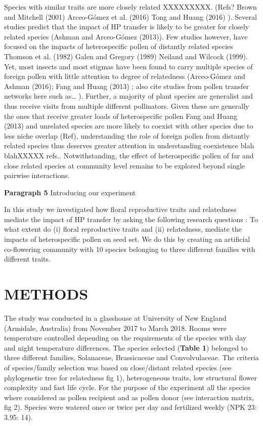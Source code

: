 \documentclass[11pt,a4paper]{article}
\begin{document}
Species with similar traits are more closely related XXXXXXXXX. (Refs?
Brown and Mitchell (2001) Arceo-Gómez et al. (2016) Tong and Huang
(2016) ). Several studies predict that the impact of HP transfer is
likely to be greater for closely related species (Ashman and Arceo-Gómez
(2013)). Few studies however, have focused on the impacts of
heterospecific pollen of distantly related species Thomson et al. (1982)
Galen and Gregory (1989) Neiland and Wilcock (1999). Yet, most insects
and most stigmas have been found to carry multiple species of foreign
pollen with little attention to degree of relatedness (Arceo-Gómez and
Ashman (2016); Fang and Huang (2013) ; also cite studies from pollen
transfer networks here such as\ldots{} ). Further, a majority of plant
species are generalist and thus receive visits from multiple different
pollinators. Given these are generally the ones that receive greater
loads of heterospecific pollen Fang and Huang (2013) and unrelated
species are more likely to coexist with other species due to less niche
overlap (Ref), understanding the role of foreign pollen from distantly
related species thus deserves greater attention in understanding
coexistence blah blahXXXXX refs.. Notwithstanding, the effect of
heterospecific pollen of far and close related species at community
level remains to be explored beyond single pairwise interactions.

\textbf{Paragraph 5} Introducing our experiment

In this study we investigated how floral reproductive traits and
relatedness mediate the impact of HP transfer by asking the following
research questions : To what extent do (i) floral reproductive traits
and (ii) relatedness, mediate the impacts of heterospecific pollen on
seed set. We do this by creating an artificial co-flowering community
with 10 species belonging to three different families with different
traits.

\section{METHODS}\label{methods}

The study was conducted in a glasshouse at University of New England
(Armidale, Australia) from November 2017 to March 2018. Rooms were
temperature controlled depending on the requirements of the species with
day and night temperature differences. The species selected
(\textbf{Table 1}) belonged to three different families, Solanaceae,
Brassicaceae and Convolvulaceae. The criteria of species/family
selection was based on close/distant related species (see phylogenetic
tree for relatedness fig 1), heterogeneous traits, low structural flower
complexity and fast life cycle. For the purpose of the experiment all
the species where considered as pollen recipient and as pollen donor
(see interaction matrix, fig 2). Species were watered once or twice per
day and fertilized weekly (NPK 23: 3.95: 14).
\end{document}
